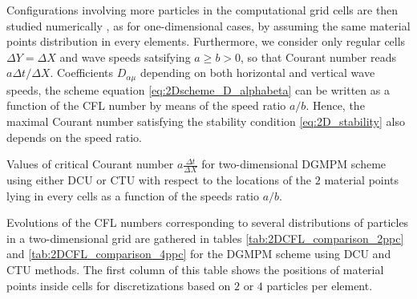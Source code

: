 Configurations involving more particles in the computational grid cells are then studied numerically
, as for one-dimensional cases, by assuming the same material points distribution in every elements. Furthermore, we consider only regular cells $\Delta Y = \Delta X$ and wave speeds satsifying $a\geq b >0$, so that Courant number reads $a\Delta t/\Delta X$. Coefficients $D_{\alpha \mu}$ depending on both horizontal and vertical wave speeds, the scheme equation \eqref{eq:2Dscheme_D_alphabeta} can be written as a function of the CFL number by means of the speed ratio  $a/b$. Hence, the maximal Courant number satisfying the stability condition \eqref{eq:2D_stability} also depends on the speed ratio.
\begin{table}[h]
  \centering
  
  \caption{Values of critical Courant number $a\frac{\Delta t}{\Delta X}$ for two-dimensional DGMPM scheme using either DCU or CTU with respect to the locations of the $2$ material points lying in every cells as a function of the speeds ratio $a/b$.}
  \label{tab:2DCFL_comparison_2ppc}
\end{table}
Evolutions of the CFL numbers corresponding to several distributions of particles in a two-dimensional grid are gathered in tables \ref{tab:2DCFL_comparison_2ppc} and \ref{tab:2DCFL_comparison_4ppc} for the DGMPM scheme using DCU and CTU methods. The first column of this table shows the positions of material points inside cells for discretizations based on $2$ or $4$ particles per element. 

